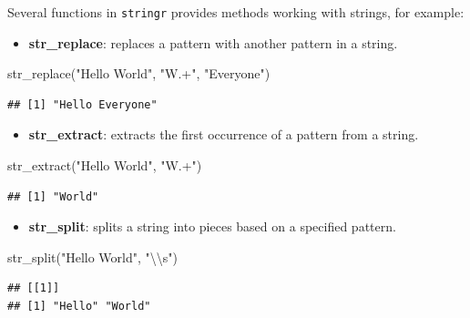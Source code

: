 \documentclass[
]{book}
\newenvironment{Shaded}{\begin{snugshade}}{\end{snugshade}}
\newcommand{\FunctionTok}[1]{\textcolor[rgb]{0.00,0.00,0.00}{#1}}
\newcommand{\NormalTok}[1]{#1}
\newcommand{\SpecialCharTok}[1]{\textcolor[rgb]{0.00,0.00,0.00}{#1}}
\newcommand{\StringTok}[1]{\textcolor[rgb]{0.31,0.60,0.02}{#1}}
\providecommand{\tightlist}{%
  \setlength{\itemsep}{0pt}\setlength{\parskip}{0pt}}
\begin{document}
Several functions in \texttt{stringr} provides methods working with strings, for example:

\begin{itemize}
\tightlist
\item
  \textbf{str\_replace}: replaces a pattern with another pattern in a string.
\end{itemize}

\begin{Shaded}
\begin{Highlighting}[]
\FunctionTok{str\_replace}\NormalTok{(}\StringTok{"Hello World"}\NormalTok{, }\StringTok{"W.+"}\NormalTok{, }\StringTok{"Everyone"}\NormalTok{)}
\end{Highlighting}
\end{Shaded}

\begin{verbatim}
## [1] "Hello Everyone"
\end{verbatim}

\begin{itemize}
\tightlist
\item
  \textbf{str\_extract}: extracts the first occurrence of a pattern from a string.
\end{itemize}

\begin{Shaded}
\begin{Highlighting}[]
\FunctionTok{str\_extract}\NormalTok{(}\StringTok{"Hello World"}\NormalTok{, }\StringTok{"W.+"}\NormalTok{)}
\end{Highlighting}
\end{Shaded}

\begin{verbatim}
## [1] "World"
\end{verbatim}

\begin{itemize}
\tightlist
\item
  \textbf{str\_split}: splits a string into pieces based on a specified pattern.
\end{itemize}

\begin{Shaded}
\begin{Highlighting}[]
\FunctionTok{str\_split}\NormalTok{(}\StringTok{"Hello World"}\NormalTok{, }\StringTok{"}\SpecialCharTok{\textbackslash{}\textbackslash{}}\StringTok{s"}\NormalTok{)}
\end{Highlighting}
\end{Shaded}

\begin{verbatim}
## [[1]]
## [1] "Hello" "World"
\end{verbatim}
\end{document}
